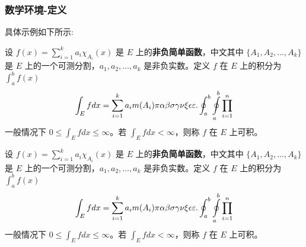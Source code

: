 \subsubsection{数学环境-定义}
具体示例如下所示:
\begin{definition}[可积性] \label{def:int} 
    设 $ f(x)=\sum\limits_{i=1}^{k} a_i \chi_{A_i}(x)$ 是 $E$ 上的\textbf{非负简单函数}，中文其中 $\{A_1,A_2,\ldots,A_k\}$ 是 $E$ 上的一个可测分割，$a_1,a_2,\ldots,a_k$ 是非负实数。定义 $f$ 在 $E$ 上的积分为 $\int_{a}^b f(x)$
    \begin{equation}\label{inter}
        \int_{E} f dx = \sum_{i=1}^k a_i m(A_i) \pi \alpha\beta\sigma\gamma\nu\xi\epsilon\varepsilon. \oint_{a}^b\ointop_{a}^b\prod_{i=1}^n
    \end{equation}
    一般情况下 $0 \leq \int_{E} f dx \leq \infty$。若 $\int_{E} f dx < \infty$，则称 $f$ 在 $E$ 上可积。
\end{definition}
\begin{tcblisting}{}
\begin{definition}[可积性] \label{def:int} 
设 $ f(x)=\sum\limits_{i=1}^{k} a_i \chi_{A_i}(x)$ 是 $E$ 上的\textbf{非负简单函数}，中文其中 $\{A_1,A_2,\ldots,A_k\}$ 是 $E$ 上的一个可测分割，$a_1,a_2,\ldots,a_k$ 是非负实数。定义 $f$ 在 $E$ 上的积分为 $\int_{a}^b f(x)$
\begin{equation}\label{inter}
\int_{E} f dx = \sum_{i=1}^k a_i m(A_i) \pi \alpha\beta\sigma\gamma\nu\xi\epsilon\varepsilon. \oint_{a}^b\ointop_{a}^b\prod_{i=1}^n
\end{equation}
一般情况下 $0 \leq \int_{E} f dx \leq \infty$。若 $\int_{E} f dx < \infty$，则称 $f$ 在 $E$ 上可积。
\end{definition}
\end{tcblisting}


